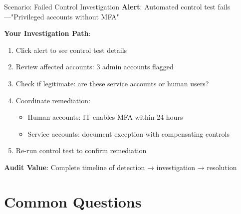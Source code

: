 \documentclass[aspectratio=169]{beamer}
\begin{document}
\begin{frame}{Scenario: Failed Control Investigation}
  \textbf{Alert}: Automated control test fails—"Privileged accounts without MFA"
  
  \vspace{0.3cm}
  
  \textbf{Your Investigation Path}:
  \begin{enumerate}
    \item Click alert to see control test details
    \item Review affected accounts: 3 admin accounts flagged
    \item Check if legitimate: are these service accounts or human users?
    \item Coordinate remediation:
      \begin{itemize}
        \item Human accounts: IT enables MFA within 24 hours
        \item Service accounts: document exception with compensating controls
      \end{itemize}
    \item Re-run control test to confirm remediation
  \end{enumerate}
  
  \vspace{0.3cm}
  
  \textbf{Audit Value}: Complete timeline of detection → investigation → resolution
\end{frame}

\section{Common Questions}
\end{document}
